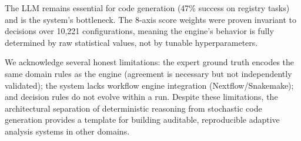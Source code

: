 \documentclass[11pt,a4paper]{article}
\begin{document}
The LLM remains essential for code generation (47\% success on
registry tasks) and is the system's bottleneck.
The 8-axis score weights were proven invariant to decisions
over 10,221 configurations, meaning the engine's behavior is
fully determined by raw statistical values, not by tunable
hyperparameters.

We acknowledge several honest limitations: the expert ground truth
encodes the same domain rules as the engine (agreement is necessary
but not independently validated); the system lacks workflow engine
integration (Nextflow/Snakemake); and decision rules do not evolve
within a run.
Despite these limitations, the architectural separation of
deterministic reasoning from stochastic code generation provides a
template for building auditable, reproducible adaptive analysis
systems in other domains.
\end{document}
